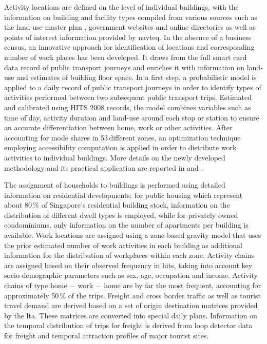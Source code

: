 Activity locations are defined on the level of individual buildings, with the information on building and facility types compiled from various sources such as the land-use master plan \citep[][]{URA_Rep_URA_2008}, government websites and online directories as well as points of interest information provided by \gls{navteq}. In the absence of a business census, an innovative approach for identification of locations and corresponding number of work places has been developed. It draws from the full smart card data record of public transport journeys and enriches it with information on land-use and estimates of building floor space. In a first step, a probabilistic model is applied to a daily record of public transport journeys in order to identify types of activities performed between two subsequent public transport trips. Estimated and calibrated using HITS 2008 records, the model combines variables such as time of day, activity duration and land-use around each stop or station to ensure an accurate differentiation between home, work or other activities. After accounting for mode shares in 53\,different zones, an optimization technique employing accessibility computation is applied in order to distribute work activities to individual buildings. More details on the newly developed methodology and its practical application are reported in \citet[][]{ChakirovErath_IATBR_2012} and \citet[][]{OrdonezErath_TRR_2013}. 

The assignment of households to buildings is performed using detailed information on residential developments: for public housing which represent about 80\,\% of Singapore's residential building stock, information on the distribution of different dwell types is employed, while for privately owned condominiums, only information on the number of apartments per building is available. Work locations are assigned using a zone-based gravity model that uses the prior estimated number of work activities in each building as additional information for the distribution of workplaces within each zone. Activity chains are assigned based on their observed frequency in \gls{hits}, taking into account key socio-demographic parameters such as sex, age, occupation and income. Activity chains of type home~--~work~--~home are by far the most frequent, accounting for approximately 50\,\% of the trips.
Freight and cross border traffic as well as tourist travel demand are derived based on a set of origin destination matrices provided by the \gls{lta}. These matrices are converted into special daily plans. Information on the temporal distribution of trips for freight is derived from loop detector data for freight and temporal attraction profiles of major tourist sites.

